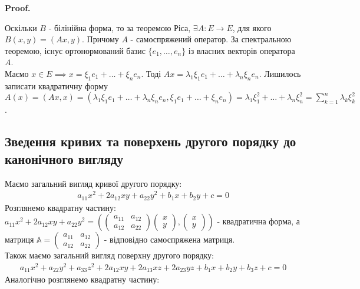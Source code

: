 \documentclass[a4paper, 10pt]{article}
\makeatletter
\theoremstyle{theoremdd}
\renewenvironment{proof}[1][Proof.\\]{\par
\pushQED{\hfill \qed}%
\normalfont \topsep6\p@\@plus6\p@\relax
\trivlist
\item\relax
{\bfseries
#1\@addpunct{.}}\hspace\labelsep\ignorespaces
}{%
\popQED\endtrivlist\@endpefalse
}
\makeatother
\begin{document}
\begin{proof}
Оскільки $B$ - білінійна форма, то за теоремою Ріса, $\exists A: E \to E$, для якого $B(x,y) = (Ax,y)$. Причому $A$ - самоспряжений оператор. За спектральною теоремою, існує ортонормований базис $\{e_1,\dots,e_n\}$ із власних векторів оператора $A$.\\
Маємо $x \in E \implies x = \xi_1 e_1 + \dots + \xi_n e_n$. Тоді $Ax = \lambda_1 \xi_1 e_1 + \dots + \lambda_n \xi_n e_n$. Лишилось записати квадратичну форму\\
$A(x) = (Ax,x) = (\lambda_1 \xi_1 e_1 + \dots + \lambda_n \xi_n e_n, \xi_1 e_1 + \dots + \xi_n e_n) = \lambda_1 \xi_1^2 + \dots + \lambda_n \xi_n^2 = \displaystyle\sum_{k=1}^n \lambda_k \xi_k^2$.
\end{proof}

\subsection{Зведення кривих та поверхень другого порядку до канонічного вигляду}
Маємо загальний вигляд кривої другого порядку:
\begin{align*}
a_{11}x^2 + 2a_{12}xy + a_{22}y^2 + b_1x + b_2y + c = 0
\end{align*}
Розглянемо квадратну частину:\\
$a_{11}x^2 + 2a_{12}xy + a_{22}y^2 = \left( \begin{pmatrix}
 a_{11} & a_{12} \\
 a_{12} & a_{22}
\end{pmatrix} \begin{pmatrix}
x \\ y
\end{pmatrix}, \begin{pmatrix}
x \\ y
\end{pmatrix} \right)$ - квадратична форма, а матриця $\mathbb{A} = \begin{pmatrix}
a_{11} & a_{12} \\
a_{12} & a_{22}
\end{pmatrix}$ - відповідно самоспряжена матриця.
\bigskip \\
Також маємо загальний вигляд поверхну другого порядку:
\begin{align*}
a_{11}x^2 + a_{22}y^2 + a_{33}z^2 + 2a_{12}xy + 2a_{13}xz + 2a_{23}yz + b_1x + b_2y + b_3z + c = 0
\end{align*}
Аналогічно розглянемо квадратну частину:\\
\end{document}
